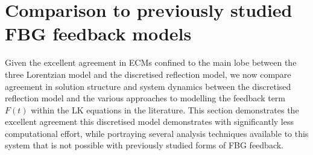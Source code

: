 \section{Comparison to previously studied FBG feedback models}
\label{sec:model_comparison}
%
Given the excellent agreement in ECMs confined to the main lobe between the three Lorentzian model and the discretised reflection model, we now compare agreement in solution structure and system dynamics between the discretised reflection model and the various approaches to modelling the feedback term $F(t)$ within the LK equations in the literature. This section demonstrates the excellent agreement this discretised model demonstrates with significantly less computational effort, while portraying several analysis techniques available to this system that is not possible with previously studied forms of FBG feedback. 
%
%

